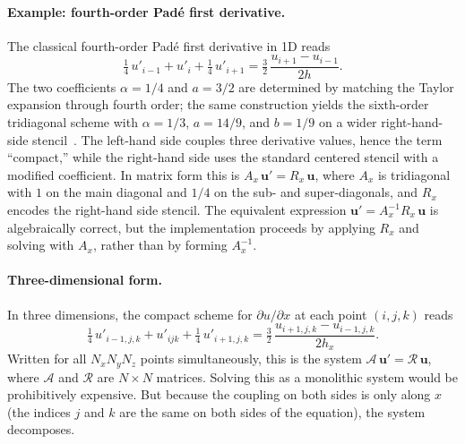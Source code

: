 \documentclass[11pt]{article}
\newcommand{\Ax}{A_{x}}
\newcommand{\Rx}{R_{x}}
\newcommand{\Nall}{N}
\begin{document}
\paragraph{Example: fourth-order Pad\'{e} first derivative.}
The classical fourth-order Pad\'{e} first derivative in 1D
reads~\citep{lele1992compact}
\begin{equation}
\label{eq:pade-example}
  \tfrac{1}{4}\,u'_{i-1} + u'_i + \tfrac{1}{4}\,u'_{i+1}
  =
  \tfrac{3}{2}\,\frac{u_{i+1} - u_{i-1}}{2h}.
\end{equation}
The two coefficients $\alpha = 1/4$ and $a = 3/2$ are determined by
matching the Taylor expansion through fourth order; the same
construction yields the sixth-order tridiagonal scheme with
$\alpha = 1/3$, $a = 14/9$, and $b = 1/9$ on a wider right-hand-side
stencil~\citep{lele1992compact}.  The left-hand side couples three
derivative values, hence the term ``compact,'' while the right-hand
side uses the standard centered stencil with a modified coefficient.
In matrix form this is $\Ax\,\bm{u}' = \Rx\,\bm{u}$, where $\Ax$ is
tridiagonal with $1$ on the main diagonal and $1/4$ on the sub- and
super-diagonals, and $\Rx$ encodes the right-hand side stencil.  The
equivalent expression $\bm{u}' = \Ax^{-1}\Rx\,\bm{u}$ is algebraically
correct, but the implementation proceeds by applying $\Rx$ and
solving with $\Ax$, rather than by forming $\Ax^{-1}$.

\paragraph{Three-dimensional form.}
In three dimensions, the compact scheme for $\partial u/\partial x$ at
each point $(i,j,k)$ reads
\begin{equation}
\label{eq:compact-3d-pointwise}
  \tfrac{1}{4}\,u'_{i-1,j,k} + u'_{ijk} + \tfrac{1}{4}\,u'_{i+1,j,k}
  =
  \tfrac{3}{2}\,\frac{u_{i+1,j,k} - u_{i-1,j,k}}{2h_x}.
\end{equation}
Written for all $N_x N_y N_z$ points simultaneously, this is the
system $\mathcal{A}\,\bm{u}' = \mathcal{R}\,\bm{u}$, where
$\mathcal{A}$ and $\mathcal{R}$ are $\Nall \times \Nall$ matrices.
Solving this as a monolithic system would be prohibitively expensive.
But because the coupling on both sides is only along $x$ (the indices
$j$ and $k$ are the same on both sides of the equation), the system
decomposes.
\end{document}
